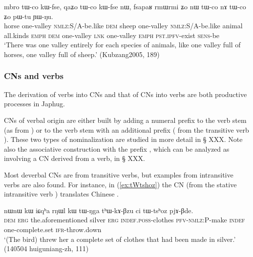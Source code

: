  \begin{exe}
\ex \label{ex:mbro.tWco}
 \gll  mbro tɯ-co kɯ-fse, qaʑo tɯ-co kɯ-fse nɯ, fsapaʁ rmɯrmi ʑo nɯ tɯ-co nɤ tɯ-co ʑo pɯ-tu ɲɯ-ŋu. \\
 horse one-valley \textsc{nmlz}:S/A-be.like  \textsc{dem} sheep one-valley \textsc{nmlz}:S/A-be.like animal all.kinds \textsc{emph} \textsc{dem}  one-valley \textsc{lnk}  one-valley \textsc{emph} \textsc{pst}.\textsc{ipfv}-exist \textsc{sens}-be \\
 \glt `There was one valley entirely for each species of animals, like one valley full of horses, one valley full of sheep.' (Kubzang2005, 189)
 \end{exe}
 
\subsubsection{CNs and verbs}   \label{sec:CN.verbs}
The derivation of verbs into CNs and that of CNs into verbs are both productive processes in Japhug. 

CNs of verbal origin are either built by adding a numeral prefix to the verb stem (as  from ) or to the verb stem with an additional prefix  ( from the transitive verb ). These two types of nominalization are studied in more detail in § XXX. Note also the associative  construction with the prefix , which can be analyzed as involving a CN derived from a verb, in § XXX. %

Most deverbal CNs are from transitive verbs, but examples from intransitive verbs are also found. For instance, in (\ref{ex:tWtshoz}) the CN  (from the stative intransitive verb ) translates Chinese .

\begin{exe}
\ex \label{ex:tWtshoz}
\gll nɯnɯ kɯ iɕqʰa rŋɯl kɯ tɯ-ŋga tʰɯ-kɤ-βzu ci tɯ-tsʰoz pjɤ-βde. \\
\textsc{dem} \textsc{erg} the.aforementioned silver \textsc{erg} \textsc{indef}.\textsc{poss}-clothes \textsc{pfv}-\textsc{nmlz}:P-make \textsc{indef} one-complete.set \textsc{ifr}-throw.down \\
\glt `(The bird) threw her a complete set of clothes that had been made in silver.'  (140504 huiguniang-zh, 111)
\end{exe}

